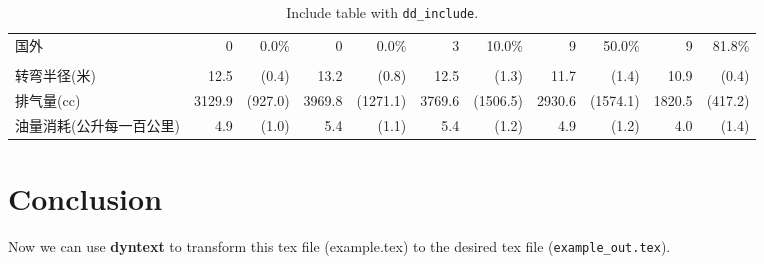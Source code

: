 \documentclass{ctexart}
\begin{document}
\begin{table}[H]
\begin{tabular}{lllllllllll}
\multicolumn{1}{l}{\hspace{1em}国外} &
  \multicolumn{1}{r}{0} &
  \multicolumn{1}{r}{0.0\%} &
  \multicolumn{1}{r}{0} &
  \multicolumn{1}{r}{0.0\%} &
  \multicolumn{1}{r}{3} &
  \multicolumn{1}{r}{10.0\%} &
  \multicolumn{1}{r}{9} &
  \multicolumn{1}{r}{50.0\%} &
  \multicolumn{1}{r}{9} &
  \multicolumn{1}{r}{81.8\%} \\
\multicolumn{1}{l}{} &
  \multicolumn{1}{r}{} &
  \multicolumn{1}{r}{} &
  \multicolumn{1}{r}{} &
  \multicolumn{1}{r}{} &
  \multicolumn{1}{r}{} &
  \multicolumn{1}{r}{} &
  \multicolumn{1}{r}{} &
  \multicolumn{1}{r}{} &
  \multicolumn{1}{r}{} &
  \multicolumn{1}{r}{} \\
\multicolumn{1}{l}{转弯半径(米)} &
  \multicolumn{1}{r}{12.5} &
  \multicolumn{1}{r}{(0.4)} &
  \multicolumn{1}{r}{13.2} &
  \multicolumn{1}{r}{(0.8)} &
  \multicolumn{1}{r}{12.5} &
  \multicolumn{1}{r}{(1.3)} &
  \multicolumn{1}{r}{11.7} &
  \multicolumn{1}{r}{(1.4)} &
  \multicolumn{1}{r}{10.9} &
  \multicolumn{1}{r}{(0.4)} \\
\multicolumn{1}{l}{排气量(cc)} &
  \multicolumn{1}{r}{3129.9} &
  \multicolumn{1}{r}{(927.0)} &
  \multicolumn{1}{r}{3969.8} &
  \multicolumn{1}{r}{(1271.1)} &
  \multicolumn{1}{r}{3769.6} &
  \multicolumn{1}{r}{(1506.5)} &
  \multicolumn{1}{r}{2930.6} &
  \multicolumn{1}{r}{(1574.1)} &
  \multicolumn{1}{r}{1820.5} &
  \multicolumn{1}{r}{(417.2)} \\
\multicolumn{1}{l}{油量消耗(公升每一百公里)} &
  \multicolumn{1}{r}{4.9} &
  \multicolumn{1}{r}{(1.0)} &
  \multicolumn{1}{r}{5.4} &
  \multicolumn{1}{r}{(1.1)} &
  \multicolumn{1}{r}{5.4} &
  \multicolumn{1}{r}{(1.2)} &
  \multicolumn{1}{r}{4.9} &
  \multicolumn{1}{r}{(1.2)} &
  \multicolumn{1}{r}{4.0} &
  \multicolumn{1}{r}{(1.4)} \\
\cline{1-11}
\end{tabular}
\caption{Include table with \texttt{dd\_include}.}
\end{table}

\section{Conclusion}
Now we can use \textbf{dyntext} to transform this tex file (example.tex) to 
the desired tex file (\texttt{example\_out.tex}).
\end{document}
